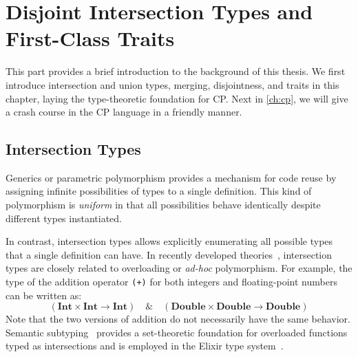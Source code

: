 \chapter{Disjoint Intersection Types and First-Class Traits} \label{ch:background}

This part provides a brief introduction to the background of this thesis. We
first introduce intersection and union types, merging, disjointness, and traits
in this chapter, laying the type-theoretic foundation for CP. Next in
\autoref{ch:cp}, we will give a crash course in the CP language in a friendly manner.

\newcommand{\tand}{\,\&\,}
\newcommand{\tor}{\,|\,}
\newcommand{\sub}{\;<:\;}

\section{Intersection Types}

Generics or parametric polymorphism provides a mechanism for code reuse by
assigning infinite possibilities of types to a single definition. This kind of
polymorphism is \emph{uniform} in that all possibilities behave identically
despite different types instantiated.

In contrast, intersection types allows explicitly enumerating all possible types
that a single definition can have. In recently developed
theories~\citep{dunfield2014elaborating,castagna2023programming}, intersection
types are closely related to overloading or \emph{ad-hoc} polymorphism. For
example, the type of the addition operator \lstinline{(+)} for both integers and
floating-point numbers can be written as:
\begin{equation*}
(\mathbf{Int} \times \mathbf{Int} \to \mathbf{Int}) \quad\&\quad
(\mathbf{Double} \times \mathbf{Double} \to \mathbf{Double})
\end{equation*}
Note that the two versions of addition do not necessarily have the same
behavior. Semantic subtyping~\citep{frisch2008semantic} provides a
set-theoretic foundation for overloaded functions typed as intersections and is
employed in the Elixir type system~\citep{castagna2023design}.


